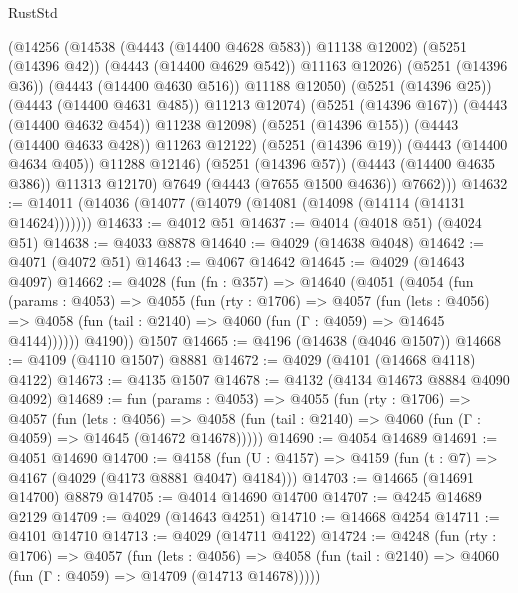 \begin{lexlean}{RustStd}
\begin{coremodule}
                      (@14256
                        (@14538 (@4443 (@14400 @4628 @583)) @11138 @12002)
                        (@5251 (@14396 @42))
                        (@4443 (@14400 @4629 @542))
                        @11163
                        @12026)
                      (@5251 (@14396 @36))
                      (@4443 (@14400 @4630 @516))
                      @11188
                      @12050)
                    (@5251 (@14396 @25))
                    (@4443 (@14400 @4631 @485))
                    @11213
                    @12074)
                  (@5251 (@14396 @167))
                  (@4443 (@14400 @4632 @454))
                  @11238
                  @12098)
                (@5251 (@14396 @155))
                (@4443 (@14400 @4633 @428))
                @11263
                @12122)
              (@5251 (@14396 @19))
              (@4443 (@14400 @4634 @405))
              @11288
              @12146)
            (@5251 (@14396 @57))
            (@4443 (@14400 @4635 @386))
            @11313
            @12170)
          @7649
          (@4443 (@7655 @1500 @4636))
          @7662)))
@14632 := @14011 (@14036 (@14077 (@14079 (@14081 (@14098 (@14114 (@14131 @14624)))))))
@14633 := @4012 @51
@14637 := @4014 (@4018 @51) (@4024 @51)
@14638 := @4033 @8878
@14640 := @4029 (@14638 @4048)
@14642 := @4071 (@4072 @51)
@14643 := @4067 @14642
@14645 := @4029 (@14643 @4097)
@14662 := @4028
    (fun (fn : @357) =>
    @14640
      (@4051
        (@4054
          (fun (params : @4053) =>
          @4055
            (fun (rty : @1706) =>
            @4057
              (fun (lets : @4056) =>
              @4058 (fun (tail : @2140) => @4060 (fun (Γ : @4059) => @14645 @4144))))))
        @4190))
    @1507
@14665 := @4196 (@14638 (@4046 @1507))
@14668 := @4109 (@4110 @1507) @8881
@14672 := @4029 (@4101 (@14668 @4118) @4122)
@14673 := @4135 @1507
@14678 := @4132 (@4134 @14673 @8884 @4090 @4092)
@14689 := fun (params : @4053) =>
  @4055
    (fun (rty : @1706) =>
    @4057
      (fun (lets : @4056) =>
      @4058 (fun (tail : @2140) => @4060 (fun (Γ : @4059) => @14645 (@14672 @14678)))))
@14690 := @4054 @14689
@14691 := @4051 @14690
@14700 := @4158 (fun (U : @4157) => @4159 (fun (t : @7) => @4167 (@4029 (@4173 @8881 @4047) @4184)))
@14703 := @14665 (@14691 @14700) @8879
@14705 := @4014 @14690 @14700
@14707 := @4245 @14689 @2129
@14709 := @4029 (@14643 @4251)
@14710 := @14668 @4254
@14711 := @4101 @14710
@14713 := @4029 (@14711 @4122)
@14724 := @4248
    (fun (rty : @1706) =>
    @4057
      (fun (lets : @4056) =>
      @4058 (fun (tail : @2140) => @4060 (fun (Γ : @4059) => @14709 (@14713 @14678)))))

\end{coremodule}
\end{lexlean}
